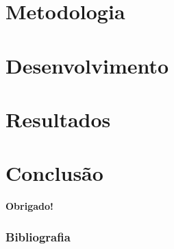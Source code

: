 \documentclass{beamer}
\begin{document}
\section{Metodologia}


\section{Desenvolvimento}


\section{Resultados}



\section{Conclusão}


\begin{frame}
    \begin{center}
        \textbf{Obrigado!}
    \end{center}   
\end{frame}

%

\begin{frame}\frametitle{Bibliografia}
	
	
\end{frame}
\end{document}
